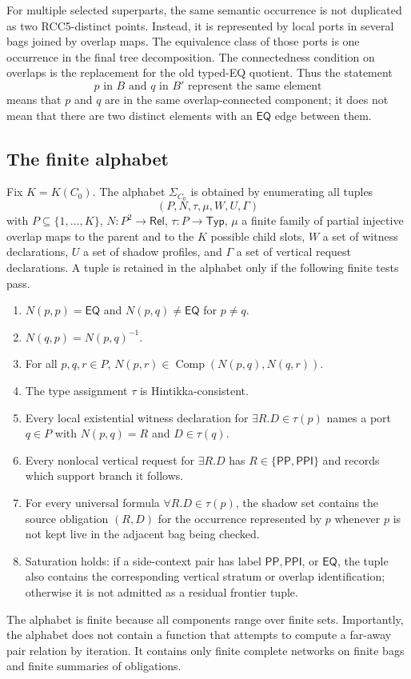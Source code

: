 \documentclass[11pt]{article}
\newcommand{\Rel}{\mathsf{Rel}}
\newcommand{\EQ}{\mathsf{EQ}}
\newcommand{\PP}{\mathsf{PP}}
\newcommand{\PPI}{\mathsf{PPI}}
\newcommand{\Comp}{\operatorname{Comp}}
\begin{document}
For multiple selected superparts, the same semantic occurrence is not duplicated as two
RCC5-distinct points.  Instead, it is represented by local ports in several bags joined
by overlap maps.  The equivalence class of those ports is one occurrence in the final
tree decomposition.  The connectedness condition on overlaps is the replacement for the
old typed-EQ quotient.  Thus the statement
\[
  p\text{ in }B \text{ and }q\text{ in }B'\text{ represent the same element}
\]
means that $p$ and $q$ are in the same overlap-connected component; it does not mean that
there are two distinct elements with an $\EQ$ edge between them.

\subsection{The finite alphabet}

Fix $K=K(C_0)$.  The alphabet $\Sigma_{C_0}$ is obtained by enumerating all tuples
\[
  (P,N,\tau,\mu,W,U,\Gamma)
\]
with $P\subseteq\{1,\ldots,K\}$, $N:P^2\to\Rel$, $\tau:P\to\mathsf{Typ}$, $\mu$ a finite
family of partial injective overlap maps to the parent and to the $K$ possible child
slots, $W$ a set of witness declarations, $U$ a set of shadow profiles, and $\Gamma$ a
set of vertical request declarations.  A tuple is retained in the alphabet only if the
following finite tests pass.
\begin{enumerate}[label=(L\arabic*)]
\item $N(p,p)=\EQ$ and $N(p,q)\ne\EQ$ for $p\ne q$.
\item $N(q,p)=N(p,q)^{-1}$.
\item For all $p,q,r\in P$, $N(p,r)\in\Comp(N(p,q),N(q,r))$.
\item The type assignment $\tau$ is Hintikka-consistent.
\item Every local existential witness declaration for $\exists R.D\in\tau(p)$ names a
port $q\in P$ with $N(p,q)=R$ and $D\in\tau(q)$.
\item Every nonlocal vertical request for $\exists R.D$ has $R\in\{\PP,\PPI\}$ and records
which support branch it follows.
\item For every universal formula $\forall R.D\in\tau(p)$, the shadow set contains the
source obligation $(R,D)$ for the occurrence represented by $p$ whenever $p$ is not kept
live in the adjacent bag being checked.
\item Saturation holds: if a side-context pair has label $\PP,\PPI$, or $\EQ$, the tuple
also contains the corresponding vertical stratum or overlap identification; otherwise it
is not admitted as a residual frontier tuple.
\end{enumerate}
The alphabet is finite because all components range over finite sets.  Importantly, the
alphabet does not contain a function that attempts to compute a far-away pair relation by
iteration.  It contains only finite complete networks on finite bags and finite summaries
of obligations.
\end{document}
